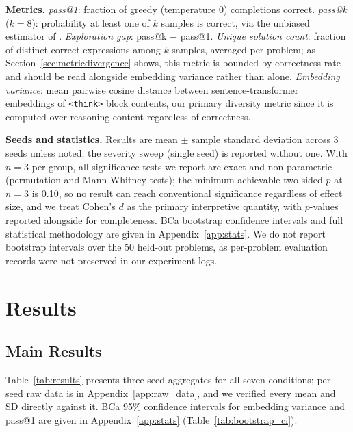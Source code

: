 \documentclass{article}
\begin{document}
\textbf{Metrics.} \label{sec:metrics} \emph{pass@1}: fraction of greedy (temperature 0) completions correct. \emph{pass@k} ($k=8$): probability at least one of $k$ samples is correct, via the unbiased estimator of \citet{chen2021}. \emph{Exploration gap}: pass@k $-$ pass@1. \emph{Unique solution count}: fraction of distinct correct expressions among $k$ samples, averaged per problem; as Section~\ref{sec:metricdivergence} shows, this metric is bounded by correctness rate and should be read alongside embedding variance rather than alone. \emph{Embedding variance}: mean pairwise cosine distance between sentence-transformer embeddings of \texttt{<think>} block contents, our primary diversity metric since it is computed over reasoning content regardless of correctness.

\textbf{Seeds and statistics.} \label{sec:seeds_stats} Results are mean $\pm$ sample standard deviation across 3 seeds unless noted; the severity sweep (single seed) is reported without one. With $n=3$ per group, all significance tests we report are exact and non-parametric (permutation and Mann-Whitney tests); the minimum achievable two-sided $p$ at $n=3$ is 0.10, so no result can reach conventional significance regardless of effect size, and we treat Cohen's $d$ as the primary interpretive quantity, with $p$-values reported alongside for completeness. BCa bootstrap confidence intervals and full statistical methodology are given in Appendix~\ref{app:stats}. We do not report bootstrap intervals over the 50 held-out problems, as per-problem evaluation records were not preserved in our experiment logs.

\section{Results}

\subsection{Main Results}

Table~\ref{tab:results} presents three-seed aggregates for all seven conditions; per-seed raw data is in Appendix~\ref{app:raw_data}, and we verified every mean and SD directly against it. BCa 95\% confidence intervals for embedding variance and pass@1 are given in Appendix~\ref{app:stats} (Table~\ref{tab:bootstrap_ci}).
\end{document}
